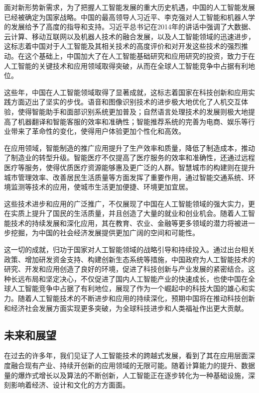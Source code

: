 面对新形势新需求，为了把握人工智能发展的重大历史机遇，中国的人工智能发展已经被确定为国家战略。中国的最高领导人习近平、李克强对人工智能和机器人学的发展给予了高度的指导和支持。习近平总书记在2014年的讲话中强调了大数据、云计算、移动互联网以及机器人技术的融合发展，以及人工智能领域的迅速进步，这标志着中国对于人工智能及其相关技术的高度评价和对开发这些技术的强烈推动。在这个基础上，中国加大了在人工智能基础研究和应用研究的投资，致力于在人工智能的关键技术和应用领域取得突破，从而在全球人工智能竞争中占据有利地位。

这些年，中国在人工智能领域取得了显著成就，这标志着国家在科技创新和应用实践方面迈出了坚实的步伐。语音和图像识别技术的进步极大地优化了人机交互体验，使得智能助手和面部识别系统更加普及；自然语言处理技术的发展则极大地提高了机器翻译和智能客服的效率和准确性；智能推荐系统的完善为电商、娱乐等行业带来了革命性的变化，使得用户体验更加个性化和高效。

在应用领域，智能制造的推广应用提升了生产效率和质量，降低了制造成本，推动了制造业的转型升级。智能医疗不仅提高了医疗服务的效率和准确性，还通过远程医疗等服务，使得优质医疗资源能够惠及更广泛的人群。智慧城市的构建则在提升城市管理效率、改善居民生活质量等方面发挥了重要作用，通过智能交通系统、环境监测等技术的应用，使城市生活更加便捷、环境更加宜居。

这些技术进步和应用的广泛推广，不仅展现了中国在人工智能领域的强大实力，更在实质上提升了国民的生活质量，并且创造了大量的就业和创业机会。随着人工智能技术的持续发展和深化应用，其在教育、农业、金融等更多领域的潜力将被进一步挖掘，为中国的社会经济发展提供更加广阔的空间和可能性。

这一切的成就，归功于国家对人工智能领域的战略引导和持续投入。通过出台相关政策、增加研发资金支持、构建创新生态系统等措施，中国政府为人工智能技术的研究、开发和应用创造了良好的环境，促进了科技创新与产业发展的紧密结合。这种长远布局和坚定决心，不仅促进了国内人工智能产业的快速成长，也使中国在全球人工智能竞争中占据了有利地位，展现了作为一个崛起中的科技大国的雄心和实力。随着人工智能技术的不断进步和应用的持续深化，预期中国将在推动科技创新和经济社会发展方面实现更多突破，为全球科技进步和人类福祉作出更大贡献。

\subsection[未来和展望]{未来和展望}

在过去的许多年，我们见证了人工智能技术的跨越式发展，看到了其在应用层面深度融合现有产业、持续开创新的应用领域的无限可能。随着计算能力的提升、数据量的爆炸式增长以及算法的不断创新，人工智能正在逐步转化为一种基础设施，深刻影响着经济、设计和文化的方方面面。

